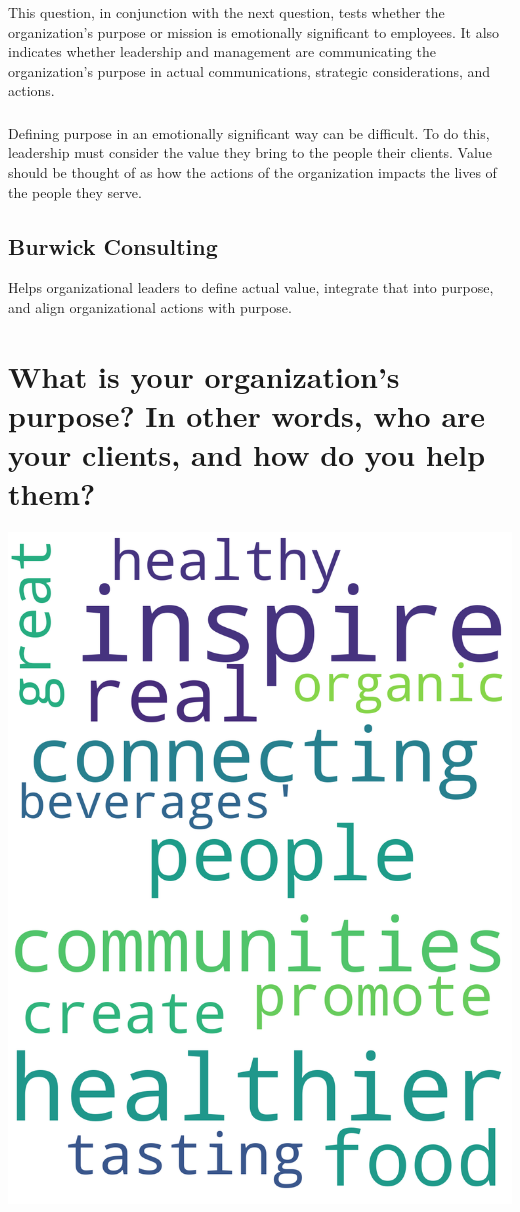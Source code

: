 \documentclass[14pt]{extreport}
\begin{document}
\subsubsection*{}
This question, in conjunction with the next question, 
tests whether the organization's purpose or mission is
emotionally significant to employees. It also indicates whether
leadership and management are communicating the
organization's purpose in actual communications, strategic
considerations, and actions.
\subsubsection*{}
Defining purpose in an emotionally significant way can be
difficult. To do this, leadership must consider the value they bring
to the people their clients. Value should be thought of as how the
actions of the organization impacts the lives of the people they serve.
\subsection*{\centering Burwick Consulting}
Helps organizational leaders to define actual value, integrate that
into purpose, and align organizational actions with purpose.

\newpage
\section*{What is your organization's purpose? In other words, who are your clients, and how do you help them?}
\begin{center}
\includegraphics[width=.80\linewidth]{q10}
\end{center}
\end{document}
